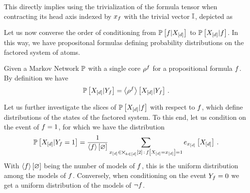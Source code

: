 

This directly implies using   the trivialization of the formula tensor when contracting its head axis indexed by $x_{f}$ with the trivial vector $\mathbb{I}$, depicted as
\begin{center}
	
\end{center}




Let us now converse the order of conditioning from $\mathbb{P}\left[f|X_{[d]}\right]$ to $\mathbb{P}\left[X_{[d]}|f\right]$.
In this way, we have propositonal formulas defining probability distributions on the factored system of atoms.

Given a Markov Network $\mathbb{P}$ with a single core $\rho^{f}$ for a propositional formula $f$.
By definition we have
\begin{align*}
	\mathbb{P}\left[X_{[d]}|Y_{f}\right] 
	= \left\langle \rho^{f}\right\rangle \left[ X_{[d]} | Y_{f} \right] \, .  
\end{align*}
\begin{center}
	
\end{center}

Let us further investigate the slices of $\mathbb{P}\left[X_{[d]}|f\right]$ with respect to $f$, which define distributions of the states of the factored system.
To this end, let us condition on the event of $f=1$, for which we have the distribution
\begin{align}\label{eq:eventFormulaProb}
	\mathbb{P}\left[X_{[d]}|Y_{f}=1\right] = \frac{1}{\left\langle f\right\rangle \left[ \varnothing \right]} \sum_{x_{[d]}\in\bigtimes_{k\in[d]}[2] \, : \, f\left[X_{[d]}=x_{[d]}\right]=1} e_{x_{[d]}}\left[X_{[d]}\right] \, .
\end{align}
With $\left\langle f\right\rangle \left[ \varnothing \right]$ being the number of models of $f$,  this is the uniform distribution among the models of $f$.
Conversely, when conditioning on the event $Y_{f}=0$ we get a uniform distribution of the models of $\lnot f$.


